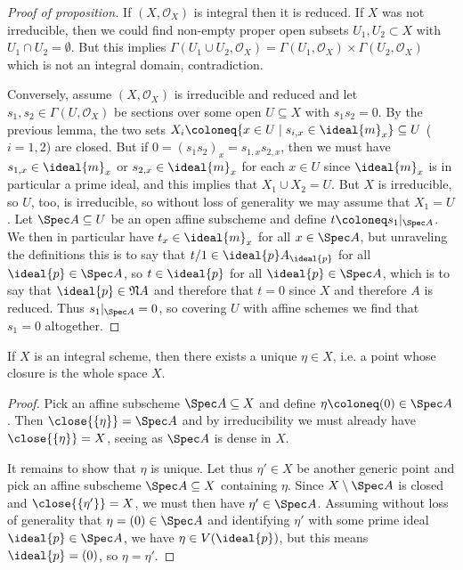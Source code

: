 \documentclass[wip, algebra]{bsteffan-lecturenotes}
\newcommand{\cO}{\mathcal{O}}
\newcommand{\Nil}{\mathfrak{N}}
\begin{document}
\begin{proof}[Proof of proposition]
	If $(X, \cO_X)$ is integral then it is reduced.
	If $X$ was not irreducible, then we could find non-empty proper open subsets $U_1, U_2 \subset X$ with $U_1 \cap U_2 = \emptyset$.
	But this implies $\Gamma(U_1 \cup U_2, \cO_X) = \Gamma(U_1, \cO_X) \times \Gamma(U_2, \cO_X)$ which is not an integral domain, contradiction.

	Conversely, assume $(X, \cO_X)$ is irreducible and reduced and let $s_1, s_2 \in \Gamma(U, \cO_X)$ be sections over some open $U \subseteq X$ with $s_1 s_2 = 0$.
	By the previous lemma, the two sets $X_i \coloneq \{x \in U \mid s_{i, x} \in \ideal{m}_x\}	\subseteq U$ ($i = 1, 2$) are closed.
	But if $0 = (s_1 s_2)_x = s_{1, x} s_{2, x}$, then we must have $s_{1, x} \in \ideal{m}_x$ or $s_{2, x} \in \ideal{m}_x$ for each $x \in U$ since $\ideal{m}_x$ is in particular a prime ideal, and this implies that $X_1 \cup X_2 = U$.
	But $X$ is irreducible, so $U$, too, is irreducible, so without loss of generality we may assume that $X_1 = U$.
	Let $\Spec A \subseteq U$ be an open affine subscheme and define $t\coloneq s_1|_{\Spec A}$.
	We then in particular have $t_x \in \ideal{m}_x$ for all $x \in \Spec A$, but unraveling the definitions this is to say that $t / 1 \in \ideal{p} A_{\ideal{p}}$ for all $\ideal{p} \in \Spec A$, so $t \in \ideal{p}$ for all $\ideal{p} \in \Spec A$, which is to say that $\ideal{p} \in \Nil A$ and therefore that $t = 0$ since $X$ and therefore $A$ is reduced.
	Thus $s_1|_{\Spec A} = 0$, so covering $U$ with affine schemes we find that $s_1 = 0$ altogether.
\end{proof}
\begin{corollary}
	If $X$ is an integral scheme, then there exists a unique  $\eta \in X$, i.e. a point whose closure is the whole space $X$.
\end{corollary}
\begin{proof}
	Pick an affine subscheme $\Spec A \subseteq X$ and define $\eta \coloneq (0) \in \Spec A$.
	Then $\close{\{\eta\}} = \Spec A$ and by irreducibility we must already have $\close{\{\eta\}} = X$, seeing as $\Spec A$ is dense in $X$.

	It remains to show that $\eta$ is unique.
	Let thus $\eta' \in X$ be another generic point and pick an affine subscheme $\Spec A \subseteq X$ containing $\eta$.
	Since $X \setminus \Spec A$ is closed and $\close{\{\eta'\}} = X$, we must then have $\eta' \in \Spec A$.
	Assuming without loss of generality that $\eta = (0) \in \Spec A$ and identifying $\eta'$ with some prime ideal $\ideal{p} \in \Spec A$, we have $\eta \in V(\ideal{p})$, but this means $\ideal{p} = (0)$, so $\eta = \eta'$.
\end{proof}
\end{document}

